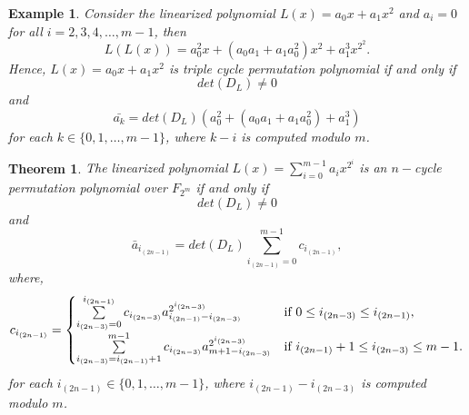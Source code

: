\documentclass[12pt,a4paper]{article}
\newtheorem{theorem}{Theorem}[section]
\newtheorem{example}{Example}[section]
\begin{document}
\begin{example}
    Consider the linearized polynomial $L(x)=a_0x+a_1x^2$ and $a_i=0$ for all $i=2,3,4,\ldots,m-1$, then 
    $$L(L(x))=a_0^2x+(a_0a_1+a_1a_0^2)x^2+a_1^3x^{2^2}.$$
    Hence, $L(x)=a_0x+a_1x^2$ is triple cycle permutation polynomial if and only if  \begin{equation}
		det(D_{L})\not=0 
  \end{equation}and
  \begin{equation}
       \bar{a_k}=det(D_L) \left(a_0^2+(a_0a_1+a_1a_0^2)+a_1^3\right)
    \end{equation}
    for each $ k\in \{0,1,\ldots,m-1\} $, where $ k-i $ is computed modulo $ m $.
\end{example}

\begin{theorem}\label{t2}
	The linearized polynomial $ L(x)=\sum\limits_{i=0}^{m-1}a_{i}x^{2^{i}} $ is an $ n-$cycle permutation polynomial over $ F_{2^{m}} $ if and only if 
	\begin{equation}
		det(D_{L})\not=0 
  \end{equation}and
 \begin{equation}
		\bar{a}_{i_{(2n-1)}}=det(D_{L})\sum\limits_{i_{(2n-1)}=0}^{m-1}c_{i_{(2n-1)}},
	\end{equation} 
     where,\begin{equation}
        c_{i_{(2n-1)}} = \begin{cases}
    \sum\limits_{i_{(2n-3)}=0}^{i_{(2n-1)}}c_{i_{(2n-3)}}a_{i_{(2n-1)}-i_{(2n-3)}}^{2^{i_{(2n-3)}}} & $\text{if $ 0\leq i_{(2n-3)}\leq i_{(2n-1)} $}$,\\
    \sum\limits_{i_{(2n-3)}=i_{(2n-1)}+1}^{m-1}c_{i_{(2n-3)}}a_{m+1-i_{(2n-3)}}^{2^{i_{(2n-3)}}} & $\text{if $i_{(2n-1)}+1\leq i_{(2n-3)}\leq m-1$}$.
		\end{cases}
    \end{equation}
  for each $ i_{(2n-1)}\in \{0,1,\ldots,m-1\} $, where $ i_{(2n-1)}-i_{(2n-3)} $ is computed modulo $ m $.
\end{theorem}
\end{document}
